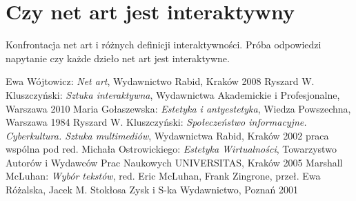 \documentclass[a4paper,12pt]{article}
\begin{document}
\section{Czy net art jest interaktywny}
Konfrontacja net art i różnych definicji interaktywności.
Próba odpowiedzi napytanie czy każde dzieło net art jest
interaktywne.


\begin{thebibliography}{6}
  Ewa Wójtowicz:
  \textit{Net art},
  Wydawnictwo Rabid, Kraków 2008
  Ryszard W. Kluszczyński:
  \textit{Sztuka interaktywna},
  Wydawnictwa Akademickie i Profesjonalne,
  Warszawa 2010
  Maria Gołaszewska:
  \textit{Estetyka i antyestetyka},
  Wiedza Powszechna, Warszawa 1984
  Ryszard W. Kluszczyński:
  \textit{Społeczeństwo informacyjne. Cyberkultura. Sztuka multimediów},
  Wydawnictwa Rabid, Kraków 2002
  praca wspólna pod red. Michała Ostrowickiego:
  \textit{Estetyka Wirtualności},
  Towarzystwo Autorów i Wydawców Prac Naukowych UNIVERSITAS,
  Kraków 2005
  Marshall McLuhan:
  \textit{Wybór tekstów},
  red. Eric McLuhan, Frank Zingrone,
  przeł. Ewa Różalska, Jacek M. Stokłosa
  Zysk i S-ka Wydawnictwo, Poznań 2001


\end{thebibliography}
\end{document}
